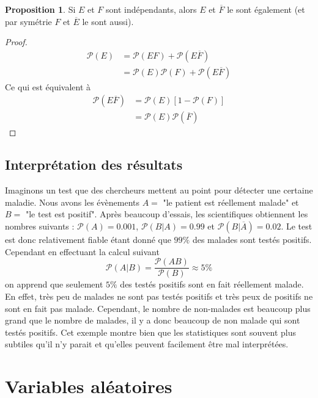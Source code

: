 \documentclass[a4paper,12pt]{report}
\theoremstyle{definition}
\renewcommand{\(}{\left(}
\renewcommand{\)}{\right)}
\renewcommand{\P}{\mathcal{P}}
\renewcommand{\bar}{\overline}
\newtheorem{prop}[thm]{Proposition}
\begin{document}
    \begin{leftbar}
    \begin{prop}    
        Si $E$ et $F$ sont indépendants, alors $E$ et $\bar{F}$ le sont également (et par symétrie $F$ et $\bar{E}$ le sont aussi).
    \end{prop}
    \end{leftbar}
    
    \begin{proof}
        \begin{align*}
            \P(E) &= \P(EF) + \P(E\bar{F})\\
            &= \P(E)\P(F) +  \P(E\bar{F})
        \end{align*}
        Ce qui est équivalent à
        \begin{align*}
            \P(E\bar{F}) &= \P(E)[1- \P(F)]\\
            &= \P(E)\P(\bar{F})
        \end{align*}
    \end{proof}
        
    \section{Interprétation des résultats}
    
        Imaginons un test que des chercheurs mettent au point pour détecter une certaine maladie. Nous avons les évènements $A =$ "le patient est réellement malade" et $B =$ "le test est positif". Après beaucoup d'essais, les scientifiques obtiennent les nombres suivants : $\P(A) = 0.001$, $\P(B|A) = 0.99$ et $\P(B|\bar{A}) = 0.02$. Le test est donc relativement fiable étant donné que $99\%$ des malades sont testés positifs. Cependant en effectuant la calcul suivant
        $$\P(A|B) = \frac{\P(AB)}{\P(B)} \approx 5\%$$
        on apprend que seulement $5\%$ des testés positifs sont en fait réellement malade. En effet, très peu de malades ne sont pas testés positifs et très peux de positifs ne sont en fait pas malade. Cependant, le nombre de non-malades est beaucoup plus grand que le nombre de malades, il y a donc beaucoup de non malade qui sont testés positifs. Cet exemple montre bien que les statistiques sont souvent plus subtiles qu'il n'y parait et qu'elles peuvent facilement être mal interprétées.

\chapter{Variables aléatoires}
\end{document}

